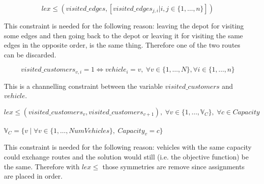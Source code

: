 \documentclass[../main.tex]{subfiles}
\begin{document}
\begin{center} %
    \begin{equation}
        lex\leq(visited\_edges, [visited\_edges_{j,i} | i,j \in \{1,\dots,n\}])
    \end{equation}
\end{center}
This constraint is needed for the following reason: leaving the depot for visiting some edges and then going back to the depot or leaving it for visiting the same edges in the opposite order, is the same thing. Therefore one of the two routes can be discarded.

\begin{center}
    \begin{equation}
        visited\_customers_{v,i} = 1 \Leftrightarrow vehicle_i = v, \; \forall v \in \{1,\dots,N\}, \forall i \in \{1,\dots,n\}
    \end{equation}
\end{center}
This is a channelling constraint between the variable $visited\_customers$ and $vehicle$.

\begin{center}
    \begin{equation}
        lex\leq(visited\_customers_{v}, visited\_customers_{v+1}), \; \forall v \in \{1,\dots,\mathbb{V}_{C}\}, \; \forall c \in Capacity
    \end{equation}\\
    \begin{math}
        \mathbb{V}_{C} = \{v \; | \; \forall v \in \{1,\dots,NumVehicles\}, \; Capacity_v = c\}
    \end{math}
\end{center}
This constraint is needed for the following reason: vehicles with the same capacity could exchange routes and the solution would still (i.e. the objective function) be the same. Therefore with $lex\leq$ those symmetries are remove since assignments are placed in order.
\end{document}
